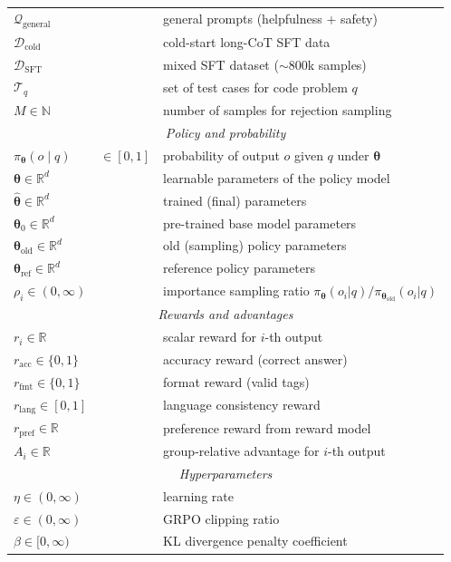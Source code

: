 \documentclass[11pt,a4paper]{article}
\newcommand{\R}{\mathbb{R}}
\newcommand{\N}{\mathbb{N}}
\newcommand{\params}{\bm{\theta}}
\newcommand{\paramshat}{\hat{\bm{\theta}}}
\begin{document}
\begin{longtable}{lll}
$\mathcal{Q}_{\mathrm{general}}$ & & general prompts (helpfulness + safety) \\
$\mathcal{D}_{\mathrm{cold}}$ & & cold-start long-CoT SFT data \\
$\mathcal{D}_{\mathrm{SFT}}$ & & mixed SFT dataset ($\sim$800k samples) \\
$\mathcal{T}_q$ & & set of test cases for code problem $q$ \\
$M \in \N$ & & number of samples for rejection sampling \\
\midrule
\multicolumn{3}{c}{\textit{Policy and probability}} \\
\midrule
$\pi_{\params}(o \mid q)$ & $\in [0,1]$ & probability of output $o$ given $q$ under $\params$ \\
$\params \in \R^d$ & & learnable parameters of the policy model \\
$\paramshat \in \R^d$ & & trained (final) parameters \\
$\params_0 \in \R^d$ & & pre-trained base model parameters \\
$\params_{\mathrm{old}} \in \R^d$ & & old (sampling) policy parameters \\
$\params_{\mathrm{ref}} \in \R^d$ & & reference policy parameters \\
$\rho_i \in (0, \infty)$ & & importance sampling ratio $\pi_{\params}(o_i|q)/\pi_{\params_{\mathrm{old}}}(o_i|q)$ \\
\midrule
\multicolumn{3}{c}{\textit{Rewards and advantages}} \\
\midrule
$r_i \in \R$ & & scalar reward for $i$-th output \\
$r_{\mathrm{acc}} \in \{0, 1\}$ & & accuracy reward (correct answer) \\
$r_{\mathrm{fmt}} \in \{0, 1\}$ & & format reward (valid tags) \\
$r_{\mathrm{lang}} \in [0, 1]$ & & language consistency reward \\
$r_{\mathrm{pref}} \in \R$ & & preference reward from reward model \\
$A_i \in \R$ & & group-relative advantage for $i$-th output \\
\midrule
\multicolumn{3}{c}{\textit{Hyperparameters}} \\
\midrule
$\eta \in (0, \infty)$ & & learning rate \\
$\varepsilon \in (0, \infty)$ & & GRPO clipping ratio \\
$\beta \in [0, \infty)$ & & KL divergence penalty coefficient \\

\end{longtable}
\end{document}
